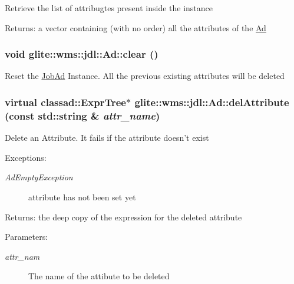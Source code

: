 Retrieve the list of attribugtes present inside the instance \begin{Desc}
\item[Returns:]a vector containing (with no order) all the attributes of the \hyperlink{classglite_1_1wms_1_1jdl_1_1Ad}{Ad}\end{Desc}
\hypertarget{classglite_1_1wms_1_1jdl_1_1Ad_z15_4}{
\subsubsection[clear]{\setlength{\rightskip}{0pt plus 5cm}void glite::wms::jdl::Ad::clear ()}}
\label{classglite_1_1wms_1_1jdl_1_1Ad_z15_4}


Reset the \hyperlink{classglite_1_1wms_1_1jdl_1_1JobAd}{Job\-Ad} Instance. All the previous existing attributes will be deleted \hypertarget{classglite_1_1wms_1_1jdl_1_1Ad_z17_1}{
\subsubsection[delAttribute]{\setlength{\rightskip}{0pt plus 5cm}virtual classad::Expr\-Tree$\ast$ glite::wms::jdl::Ad::del\-Attribute (const std::string \& {\em attr\_\-name})}}
\label{classglite_1_1wms_1_1jdl_1_1Ad_z17_1}


Delete an Attribute. It fails if the attribute doesn't exist \begin{Desc}
\item[Exceptions:]
\begin{description}
\item[{\em Ad\-Empty\-Exception}]attribute has not been set yet \end{description}
\end{Desc}
\begin{Desc}
\item[Returns:]the deep copy of the expression for the deleted attribute \end{Desc}
\begin{Desc}
\item[Parameters:]
\begin{description}
\item[{\em attr\_\-nam}]The name of the attibute to be deleted \end{description}
\end{Desc}


